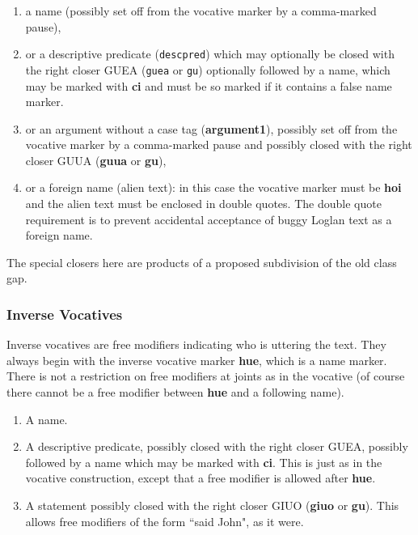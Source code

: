 \documentclass[12pt]{book}
\begin{document}
{\begin{enumerate}

\item a name (possibly set off from the vocative marker by a comma-marked pause), 


\item or a descriptive predicate ({\tt descpred}) which may optionally be closed with the right closer GUEA ({\tt guea} or {\tt gu}) optionally followed by a name, which may be marked with {\bf ci} and must be so marked if it contains a false name marker.

\item or an argument without a case tag ({\bf argument1}), possibly set off from the vocative marker by a comma-marked pause and possibly closed with the right closer GUUA ({\bf guua} or {\bf gu}),

\item or a foreign name (alien text):  in this case the vocative marker must be {\bf hoi} and the alien text must be enclosed in double quotes.  The double quote requirement is to prevent accidental acceptance of buggy Loglan text as a foreign name.

\end{enumerate}

The special closers here are products of a proposed subdivision of the old class gap.

\subsubsection{Inverse Vocatives}

Inverse vocatives are free modifiers indicating who is uttering the text.  They always begin with the inverse vocative marker {\bf hue}, which is a name marker.  There is not a restriction on free modifiers at joints as in the vocative (of course there cannot be a free modifier between {\bf hue} and a following name).

\begin{enumerate}


\item  A name.

\item  A descriptive predicate, possibly closed with the right closer GUEA, possibly followed by a name which may be marked with {\bf ci}.  This is just as in the vocative construction, except that a free modifier is allowed after {\bf hue}.

\item  A statement possibly closed with the right closer GIUO ({\bf giuo} or {\bf gu}).  This allows free modifiers of the form ``said John", as it were.


\end{enumerate}}
\end{document}
